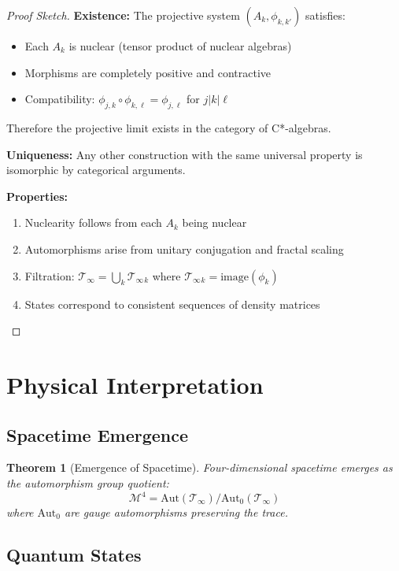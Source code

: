 \documentclass[12pt,letterpaper]{article}
\newcommand{\timelessfield}{\mathcal{T}_\infty}
\newtheorem{theorem}{Theorem}[section]
\begin{document}
\begin{proof}[Proof Sketch]
\textbf{Existence:} The projective system $(A_k, \phi_{k,k'})$ satisfies:
\begin{itemize}
\item Each $A_k$ is nuclear (tensor product of nuclear algebras)
\item Morphisms are completely positive and contractive
\item Compatibility: $\phi_{j,k} \circ \phi_{k,\ell} = \phi_{j,\ell}$ for $j|k|\ell$
\end{itemize}
Therefore the projective limit exists in the category of C*-algebras.

\textbf{Uniqueness:} Any other construction with the same universal property is isomorphic by categorical arguments.

\textbf{Properties:} 
\begin{enumerate}
\item Nuclearity follows from each $A_k$ being nuclear
\item Automorphisms arise from unitary conjugation and fractal scaling
\item Filtration: $\timelessfield = \bigcup_{k} \timelessfield{_k}$ where $\timelessfield{_k} = \text{image}(\phi_k)$
\item States correspond to consistent sequences of density matrices
\end{enumerate}
\end{proof}

\section{Physical Interpretation}

\subsection{Spacetime Emergence}

\begin{theorem}[Emergence of Spacetime]
Four-dimensional spacetime emerges as the automorphism group quotient:
\begin{equation}
\mathcal{M}^4 = \text{Aut}(\timelessfield) / \text{Aut}_0(\timelessfield)
\end{equation}
where $\text{Aut}_0$ are gauge automorphisms preserving the trace.
\end{theorem}

\subsection{Quantum States}
\end{document}
